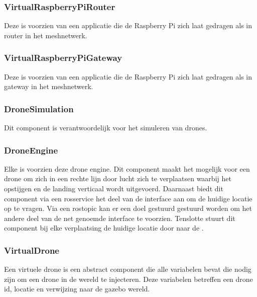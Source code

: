 \documentclass[a4paper, 11pt, oneside]{report}
\begin{document}
\subsubsection{VirtualRaspberryPiRouter}
\label{architectural:subcomponenten:VirtualRaspberryPiRouter}
Deze  is voorzien van een applicatie die de Raspberry Pi zich laat gedragen als in router in het meshnetwerk. 

\subsubsection{VirtualRaspberryPiGateway}
\label{architectural:subcomponenten:VirtualRaspberryPiGateway}
Deze  is voorzien van een applicatie die de Raspberry Pi zich laat gedragen als in gateway in het meshnetwerk. 


\subsubsection{DroneSimulation}
\label{architectural:subcomponenten:DroneSimulation}
Dit component is verantwoordelijk voor het simuleren van drones. 

\subsubsection{DroneEngine}
\label{architectural:subcomponenten:DroneEngine}
Elke  is voorzien deze drone engine. 
Dit component maakt het mogelijk voor een drone om zich in een rechte lijn door lucht zich te verplaatsen waarbij het opstijgen en de landing verticaal wordt uitgevoerd.
Daarnaast biedt dit component via een rosservice het deel van de interface  aan om de huidige locatie op te vragen.
Via een rostopic kan er een doel gestuurd gestuurd worden om het andere deel van de net genoemde interface te voorzien.
Tenslotte stuurt dit component bij elke verplaatsing de huidige locatie door naar de . 

\subsubsection{VirtualDrone}
\label{architectural:subcomponenten:VirtualDrone}
Een virtuele drone is een abstract component die alle variabelen bevat die nodig zijn om een drone in de wereld te injecteren. Deze variabelen betreffen een drone id, locatie en verwijzing naar de gazebo wereld. 
\end{document}
